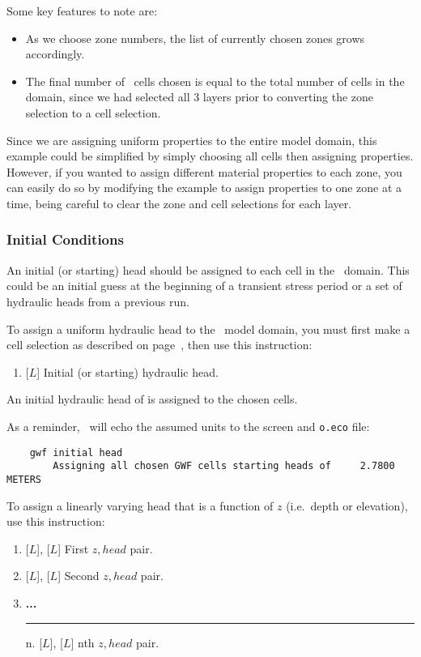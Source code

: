 {Some key features to note are:
\begin{itemize}
    \item As we choose zone numbers, the list of currently chosen zones grows accordingly.
    \item The final number of \gwf\ cells chosen is equal to the total number of cells in the domain, since we had selected all 3 layers prior to converting the  zone selection to a cell selection.
\end{itemize}
Since we are assigning uniform properties to the entire model domain, this example could be simplified by simply choosing all cells then assigning properties.  However, if you wanted to assign different material properties to each zone, you can easily do so by modifying the example to assign properties to one zone at a time, being careful to clear the zone and cell selections for each layer.

\subsubsection{Initial Conditions}  
An initial (or starting) head should be assigned to each cell in the \gwf\ domain.  This could be an initial guess at the beginning of a transient stress period or a set of hydraulic heads from a previous run.

To assign a uniform hydraulic head to the \gwf\ model domain, you must first make a cell selection as described on page~\pageref{page:cellSelect}, then use this instruction:

    {
        \squish
        \begin{enumerate}
        \item {} [$L$]  Initial (or starting) hydraulic head.
        \end{enumerate}
          An initial hydraulic head  of  is assigned to the chosen cells.
    }

As a reminder, \mut\ will echo the assumed units to the screen and \texttt{o.eco} file:
\begin{verbatim}
    gwf initial head
    	Assigning all chosen GWF cells starting heads of     2.7800         METERS

\end{verbatim}


To assign a linearly varying head that is a function of $z$ (i.e.\ depth or elevation), use this instruction:
    {
    \squish
    \begin{enumerate}
    \item {} [$L$],  [$L$]  First $z, head$ pair.
    \item {} [$L$],  [$L$]  Second $z, head$ pair.
    \item \textbf{...}\\
     \hspace*{-.27in}\rule{0.in}{.24in} n.  [$L$],   [$L$]  nth $z, head$  pair.
    \end{enumerate}

}}
